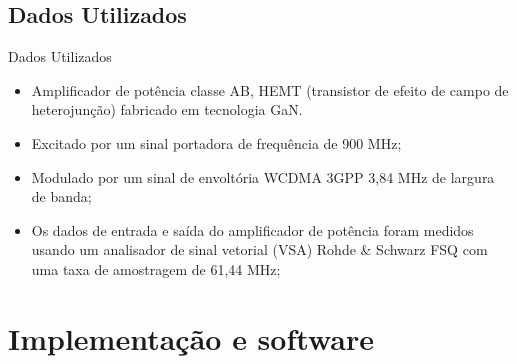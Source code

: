 \documentclass{if-beamer}
\begin{document}
\subsection{Dados Utilizados}
\begin{frame}{Dados Utilizados}
	\begin{minipage}{0.5\textwidth}
		
		
	\end{minipage}%
	\hspace{0.04\textwidth}
	\begin{minipage}{0.5\textwidth}
		\begin{itemize}
			\item Amplificador de potência classe AB, HEMT (transistor de efeito de campo de heterojunção) fabricado em tecnologia GaN.
			\item Excitado por um sinal portadora de frequência de 900	MHz;
			\item Modulado por um sinal de envoltória WCDMA 3GPP 3,84 MHz de largura de banda;
			\item Os dados de entrada e saída do amplificador de potência foram medidos usando um analisador de sinal vetorial (VSA) Rohde \& Schwarz FSQ com uma taxa de amostragem de 61,44 MHz;
		\end{itemize}
	\end{minipage}
\end{frame}

\section{Implementação e software}
\end{document}
